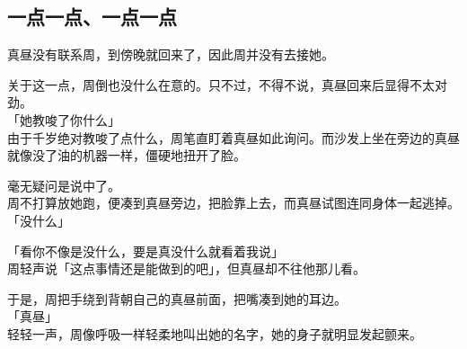 \subsection{一点一点、一点一点}

真昼没有联系周，到傍晚就回来了，因此周并没有去接她。

关于这一点，周倒也没什么在意的。只不过，不得不说，真昼回来后显得不太对劲。\\

「她教唆了你什么」\\

由于千岁绝对教唆了点什么，周笔直盯着真昼如此询问。而沙发上坐在旁边的真昼就像没了油的机器一样，僵硬地扭开了脸。

毫无疑问是说中了。\\

周不打算放她跑，便凑到真昼旁边，把脸靠上去，而真昼试图连同身体一起逃掉。\\

「没什么」

「看你不像是没什么，要是真没什么就看着我说」\\

周轻声说「这点事情还是能做到的吧」，但真昼却不往他那儿看。

于是，周把手绕到背朝自己的真昼前面，把嘴凑到她的耳边。\\

「真昼」\\

轻轻一声，周像呼吸一样轻柔地叫出她的名字，她的身子就明显发起颤来。

